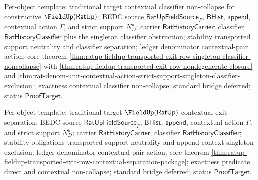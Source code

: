 Per-object template: traditional target contextual classifier non-collapse for
constructive $\FieldUp(\mathsf{RatUp})$; BEDC source
$\mathsf{RatUpFieldSource}_F$, $\mathsf{BHist}$, $\mathsf{append}$, contextual
action $\Gamma$, and strict support $N_D^u$; carrier
$\mathsf{RatHistoryCarrier}$; classifier $\mathsf{RatHistoryClassifier}$ plus
the singleton classifier obstruction; stability transported support neutrality
and classifier separation; ledger denominator contextual-pair action; core
theorem
\autoref{thm:ratup-fieldup-transported-exit-row-singleton-classifier-noncollapse}
with
\autoref{thm:ratup-fieldup-transported-exit-row-nondegenerate-closure} and
\autoref{thm:rat-denom-unit-contextual-action-strict-support-singleton-classifier-exclusion};
exactness contextual classifier non-collapse; standard bridge deferred; status
$\mathsf{ProofTarget}$.

Per-object template: traditional target $\FieldUp(\mathsf{RatUp})$ contextual
exit separation; BEDC source $\mathsf{RatUpFieldSource}_F$, $\mathsf{BHist}$,
$\mathsf{append}$, contextual action $\Gamma$, and strict support $N_D^u$;
carrier $\mathsf{RatHistoryCarrier}$; classifier
$\mathsf{RatHistoryClassifier}$; stability obligations transported support
neutrality and append-context singleton exclusion; ledger denominator
contextual-pair action; core theorem
\autoref{thm:ratup-fieldup-transported-exit-row-contextual-separation-package};
exactness predicate direct and contextual non-collapse; standard bridge
deferred; status $\mathsf{ProofTarget}$.
